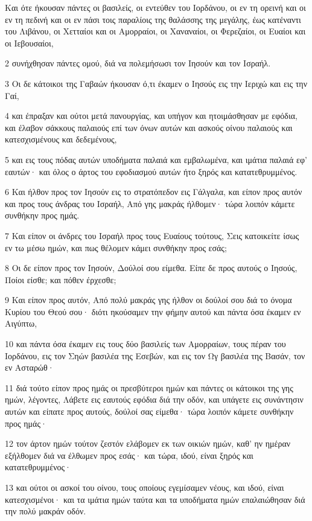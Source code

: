 \par Και ότε ήκουσαν πάντες οι βασιλείς, οι εντεύθεν του Ιορδάνου, οι εν τη ορεινή και οι εν τη πεδινή και οι εν πάσι τοις παραλίοις της θαλάσσης της μεγάλης, έως κατέναντι του Λιβάνου, οι Χετταίοι και οι Αμορραίοι, οι Χαναναίοι, οι Φερεζαίοι, οι Ευαίοι και οι Ιεβουσαίοι,
\par 2 συνήχθησαν πάντες ομού, διά να πολεμήσωσι τον Ιησούν και τον Ισραήλ.
\par 3 Οι δε κάτοικοι της Γαβαών ήκουσαν ό,τι έκαμεν ο Ιησούς εις την Ιεριχώ και εις την Γαί,
\par 4 και έπραξαν και ούτοι μετά πανουργίας, και υπήγον και ητοιμάσθησαν με εφόδια, και έλαβον σάκκους παλαιούς επί των όνων αυτών και ασκούς οίνου παλαιούς και κατεσχισμένους και δεδεμένους,
\par 5 και εις τους πόδας αυτών υποδήματα παλαιά και εμβαλωμένα, και ιμάτια παλαιά εφ' εαυτών· και όλος ο άρτος του εφοδιασμού αυτών ήτο ξηρός και κατατεθρυμμένος.
\par 6 Και ήλθον προς τον Ιησούν εις το στρατόπεδον εις Γάλγαλα, και είπον προς αυτόν και προς τους άνδρας του Ισραήλ, Από γης μακράς ήλθομεν· τώρα λοιπόν κάμετε συνθήκην προς ημάς.
\par 7 Και είπον οι άνδρες του Ισραήλ προς τους Ευαίους τούτους, Σεις κατοικείτε ίσως εν τω μέσω ημών, και πως θέλομεν κάμει συνθήκην προς εσάς;
\par 8 Οι δε είπον προς τον Ιησούν, Δούλοί σου είμεθα. Είπε δε προς αυτούς ο Ιησούς, Ποίοι είσθε; και πόθεν έρχεσθε;
\par 9 Και είπον προς αυτόν, Από πολύ μακράς γης ήλθον οι δούλοί σου διά το όνομα Κυρίου του Θεού σου· διότι ηκούσαμεν την φήμην αυτού και πάντα όσα έκαμεν εν Αιγύπτω,
\par 10 και πάντα όσα έκαμεν εις τους δύο βασιλείς των Αμορραίων, τους πέραν του Ιορδάνου, εις τον Σηών βασιλέα της Εσεβών, και εις τον Ωγ βασιλέα της Βασάν, τον εν Ασταρώθ·
\par 11 διά τούτο είπον προς ημάς οι πρεσβύτεροι ημών και πάντες οι κάτοικοι της γης ημών, λέγοντες, Λάβετε εις εαυτούς εφόδια διά την οδόν, και υπάγετε εις συνάντησιν αυτών και είπατε προς αυτούς, δούλοί σας είμεθα· τώρα λοιπόν κάμετε συνθήκην προς ημάς·
\par 12 τον άρτον ημών τούτον ζεστόν ελάβομεν εκ των οικιών ημών, καθ' ην ημέραν εξήλθομεν διά να έλθωμεν προς εσάς· και τώρα, ιδού, είναι ξηρός και κατατεθρυμμένος·
\par 13 και ούτοι οι ασκοί του οίνου, τους οποίους εγεμίσαμεν νέους, και ιδού, είναι κατεσχισμένοι· και τα ιμάτια ημών ταύτα και τα υποδήματα ημών επαλαιώθησαν διά την πολύ μακράν οδόν.

